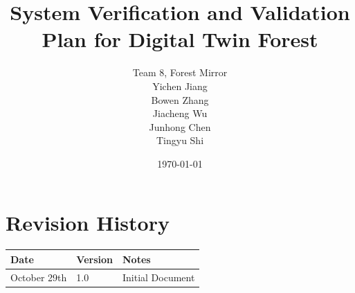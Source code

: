 \documentclass[12pt, titlepage]{article}
\begin{document}
\title{System Verification and Validation Plan for Digital Twin Forest} 
\author{Team 8, Forest Mirror\\Yichen Jiang\\ Bowen Zhang\\ Jiacheng Wu\\ Junhong Chen\\ Tingyu Shi}
\date{\today}
	
\maketitle


\section{Revision History}

\begin{tabularx}{\textwidth}{p{3cm}p{2cm}X}
\toprule {\bf Date} & {\bf Version} & {\bf Notes}\\
\midrule
October 29th & 1.0 & Initial Document\\
\bottomrule
\end{tabularx}

\newpage

\tableofcontents
\listoftables
\listoffigures

\newpage
\end{document}
